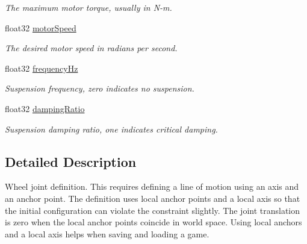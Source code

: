 \begin{DoxyCompactItemize}
\begin{DoxyCompactList}\small\item\em The maximum motor torque, usually in N-\/m. \end{DoxyCompactList}\item 
float32 \hyperlink{structb2_wheel_joint_def_a7248e25f2ca6b6c2a5f7079ce16e7748}{motor\+Speed}\hypertarget{structb2_wheel_joint_def_a7248e25f2ca6b6c2a5f7079ce16e7748}{}\label{structb2_wheel_joint_def_a7248e25f2ca6b6c2a5f7079ce16e7748}

\begin{DoxyCompactList}\small\item\em The desired motor speed in radians per second. \end{DoxyCompactList}\item 
float32 \hyperlink{structb2_wheel_joint_def_acf3540f46eaf3bc91426386939bd37b1}{frequency\+Hz}\hypertarget{structb2_wheel_joint_def_acf3540f46eaf3bc91426386939bd37b1}{}\label{structb2_wheel_joint_def_acf3540f46eaf3bc91426386939bd37b1}

\begin{DoxyCompactList}\small\item\em Suspension frequency, zero indicates no suspension. \end{DoxyCompactList}\item 
float32 \hyperlink{structb2_wheel_joint_def_a9976584bfee18b46dec355764797ce54}{damping\+Ratio}\hypertarget{structb2_wheel_joint_def_a9976584bfee18b46dec355764797ce54}{}\label{structb2_wheel_joint_def_a9976584bfee18b46dec355764797ce54}

\begin{DoxyCompactList}\small\item\em Suspension damping ratio, one indicates critical damping. \end{DoxyCompactList}\end{DoxyCompactItemize}


\subsection{Detailed Description}
Wheel joint definition. This requires defining a line of motion using an axis and an anchor point. The definition uses local anchor points and a local axis so that the initial configuration can violate the constraint slightly. The joint translation is zero when the local anchor points coincide in world space. Using local anchors and a local axis helps when saving and loading a game. 


